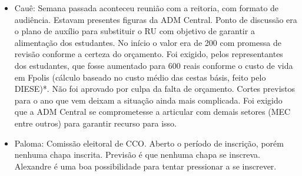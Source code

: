 \documentclass{ata-calico}
\begin{document}
\maketitle

\begin{itemize}
    \item Cauê: Semana passada aconteceu reunião com a reitoria, com formato de audiência. Estavam presentes figuras da ADM Central. Ponto de discussão era o plano de auxílio para substituir o RU com objetivo de garantir a alimentação dos estudantes. No início o valor era de 200 com promessa de revisão conforme a certeza do orçamento. Foi exigido, pelos representantes dos estudantes, que fosse aumentado para 600 reais conforme o custo de vida em Fpolis (cálculo baseado no custo médio das cestas básis, feito pelo DIESE)*. Não foi aprovado por culpa da falta de orçamento. Cortes previstos para o ano que vem deixam a situação ainda mais complicada. Foi exigido que a ADM Central se comprometesse a articular com demais setores (MEC entre outros) para garantir recurso para isso.
    
    \item Paloma: Comissão eleitoral de CCO. Aberto o período de inscrição, porém nenhuma chapa inscrita. Previsão é que nenhuma chapa se inscreva. Alexandre é uma boa possibilidade para tentar pressionar a se inscrever. 
\end{itemize}
\end{document}
